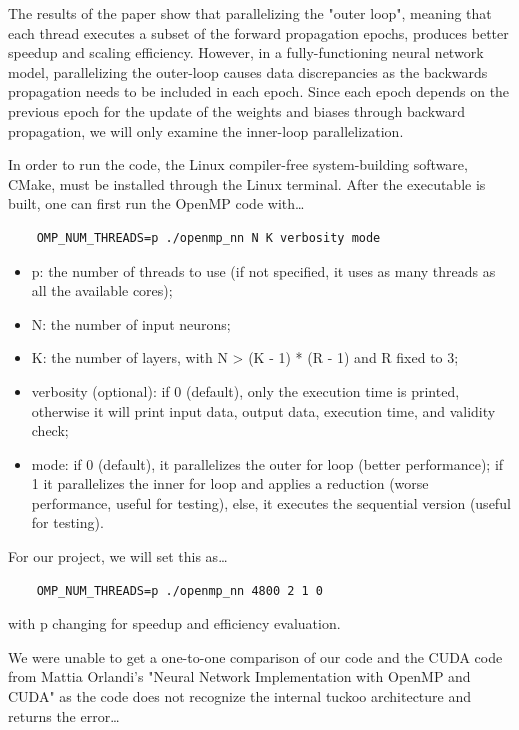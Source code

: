 \documentclass[11pt]{article}
\begin{document}
\bigskip

The results of the paper show that parallelizing the "outer loop", meaning that each thread executes a subset of the forward propagation epochs, produces better speedup and scaling efficiency. However, in a fully-functioning neural network model, parallelizing the outer-loop causes data discrepancies as the backwards propagation needs to be included in each epoch. Since each epoch depends on the previous epoch for the update of the weights and biases through backward propagation, we will only examine the inner-loop parallelization.

\bigskip

In order to run the code, the Linux compiler-free system-building software, CMake, must be installed through the Linux terminal. After the executable is built, one can first run the OpenMP code with\ldots

\begin{lstlisting}
    OMP_NUM_THREADS=p ./openmp_nn N K verbosity mode
\end{lstlisting}

\begin{itemize}
    \item p: the number of threads to use (if not specified, it uses as many threads as all the available cores);
    \item N: the number of input neurons;
    \item K: the number of layers, with N > (K - 1) * (R - 1) and R fixed to 3;
    \item verbosity (optional): if 0 (default), only the execution time is printed, otherwise it will print input data, output data, execution time, and validity check;
    \item mode: if 0 (default), it parallelizes the outer for loop (better performance); if 1 it parallelizes the inner for loop and applies a reduction (worse performance, useful for testing), else, it executes the sequential version (useful for testing).
\end{itemize}

For our project, we will set this as\ldots

\begin{lstlisting}
    OMP_NUM_THREADS=p ./openmp_nn 4800 2 1 0
\end{lstlisting}

with p changing for speedup and efficiency evaluation.

\bigskip

We were unable to get a one-to-one comparison of our code and the CUDA code from Mattia Orlandi’s "Neural Network Implementation with OpenMP and CUDA" as the code does not recognize the internal tuckoo architecture and returns the error\ldots
\end{document}
